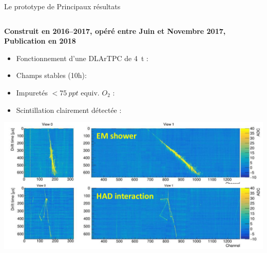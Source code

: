    	\begin{frame}{Le prototype de \TOO{}}{Principaux résultats}
       	\begin{scriptsize}
           	\begin{columns}
               	\begin{column}{0.5\textwidth}
                   	\textbf{Construit en 2016--2017, opéré entre Juin et Novembre 2017, Publication en 2018}\\
       	           	\begin{itemize}
           	           	\item Fonctionnement d'une DLArTPC de \SI{4}{\tonne} : \textcolor{green}{\checkmark}
       	               	\item Champs stables (10h):
       	               	\begin{itemize}
       	               	\end{itemize}
       	               	\item Impuretés $<\SI{75}{ppt}$ equiv. $O_2$ : \textcolor{green}{\checkmark}
       	               	\item Scintillation clairement détectée : \textcolor{green}{\checkmark}
       	           	\end{itemize}
       	           	\hspace{-0.3cm}\includegraphics[width=1.2\textwidth]{./pictures/events.png}
               	\end{column}

\end{columns}
\end{scriptsize}
\end{frame}
